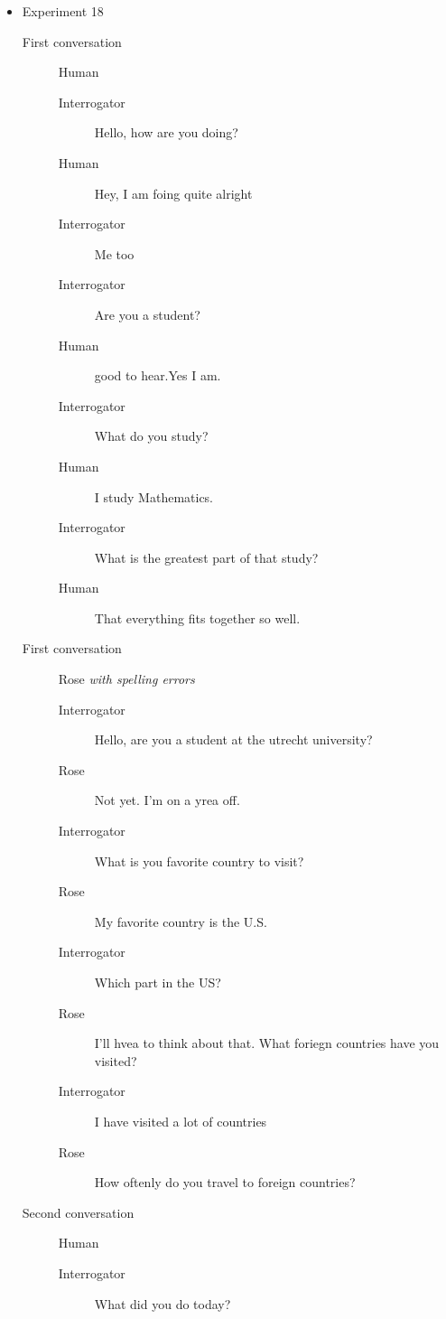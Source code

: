 \begin{itemize}
   \item Experiment 18
      \begin{description}
         \item [First conversation] Human
            \begin{description}
               \item [Interrogator] Hello, how are you doing?
               \item [Human] Hey, I am foing quite alright
               \item [Interrogator] Me too
               \item [Interrogator] Are you a student?
               \item [Human] good to hear.Yes I am.
               \item [Interrogator] What do you study?
               \item [Human] I study Mathematics.
               \item [Interrogator] What is the greatest part of that study?
               \item [Human] That everything fits together so well.
            \end{description}
         \item [First conversation] Rose \textit{with spelling errors}
            \begin{description}
               \item [Interrogator] Hello, are you a student at the utrecht university?
               \item [Rose] Not yet. I'm on a yrea off.
               \item [Interrogator] What is you favorite country to visit?
               \item [Rose] My favorite country is the U.S.
               \item [Interrogator] Which part in the US?
               \item [Rose] I'll hvea to think about that. What foriegn countries have you visited?
               \item [Interrogator] I have visited a lot of countries
               \item [Rose] How oftenly do you travel to foreign countries?
            \end{description}
         \item [Second conversation] Human
            \begin{description}
               \item [Interrogator] What did you do today?

\end{description}
\end{description}
\end{itemize}
